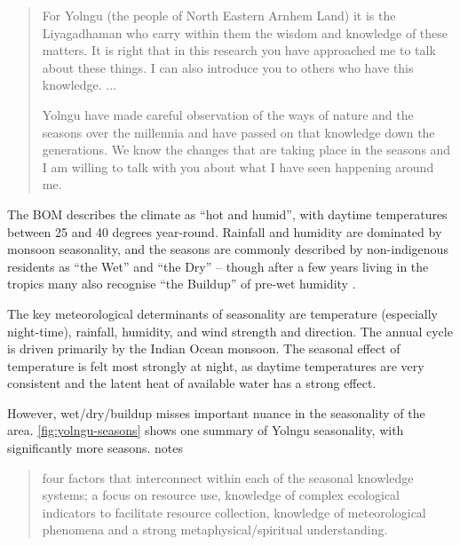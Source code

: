 \blockquote{
    For Yolngu (the people of North Eastern Arnhem Land) it is the Liyagadhaman
    who carry within them the wisdom and knowledge of these matters.
    It is right that in this research you have approached me to talk about these
    things. I can also introduce you to others who have this knowledge.  ...

    Yolngu have made careful observation of the ways of nature and the seasons
    over the millennia and have passed on that knowledge down the generations.
    We know the changes that are taking place in the seasons and I am willing
    to talk with you about what I have seen happening around me.
}




The BOM describes the 
climate as ``hot and humid'', with daytime temperatures between 25 and 40 
degrees year-round.  Rainfall and humidity are dominated by monsoon 
seasonality, and the seasons are commonly described by non-indigenous residents 
as “the Wet” and “the Dry” – though after a few years living in the tropics
many also recognise “the Buildup” of pre-wet humidity \citep{willmett2009}.

The key meteorological determinants of seasonality are temperature (especially 
night-time), rainfall, humidity, and wind strength and direction.  The annual 
cycle is driven primarily by the Indian Ocean monsoon.  The seasonal effect of 
temperature is felt most strongly at night, as daytime temperatures are very 
consistent and the latent heat of available water has a strong effect.

However, wet/dry/buildup misses important nuance in the seasonality of the 
area.  \autoref{fig:yolngu-seasons} shows one summary of Yolngu seasonality,
with significantly more seasons.  \citet{woodward2012b} notes
\blockquote{
    four factors that interconnect within each of the seasonal
    knowledge systems; a focus on resource use, knowledge of complex
    ecological indicators to facilitate resource collection,
    knowledge of meteorological phenomena and a strong
    metaphysical/spiritual understanding.
}

